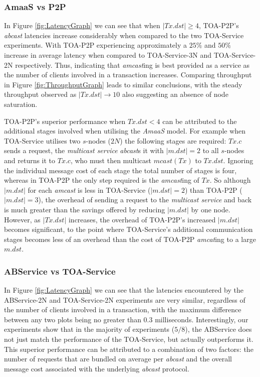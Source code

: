     \subsubsection*{AmaaS vs P2P}
	In Figure \ref{fig:LatencyGraph} we can see that when $|Tx.dst| \geq 4$, TOA-P2P's \emph{abcast} latencies increase considerably when compared to the two TOA-Service experiments.  With TOA-P2P experiencing approximately a $25\%$ and $50\%$ increase in average latency when compared to TOA-Service-3N and TOA-Service-2N respectively.  Thus, indicating that \emph{amcast}ing is best provided as a service as the number of clients involved in a transaction increases. Comparing throughput in Figure \ref{fig:ThroughputGraph} leads to similar conclusions, with the steady throughput observed as $|Tx.dst| \rightarrow 10$ also suggesting an absence of node saturation.  
	
	TOA-P2P's superior performance when $Tx.dst < 4$ can be attributed to the additional stages involved when utilising the \emph{AmaaS} model.  For example when TOA-Service utilises two $s$-nodes ($2N$) the following stages are required: $Tx.c$ sends a request, the \emph{multicast service} \emph{abcast}s it with $|m.dst| = 2$ to all $s$-nodes and returns it to $Tx.c$, who must then multicast $mcast(Tx)$ to $Tx.dst$.  Ignoring the individual message cost of each stage the total number of stages is four, whereas in TOA-P2P the only step required is the \emph{amcast}ing of $Tx$.  So although $|m.dst|$ for each \emph{amcast} is less in TOA-Service ($|m.dst| = 2$) than TOA-P2P ($|m.dst| = 3$), the overhead of sending a request to the \emph{multicast service} and back is much greater than the savings offered by reducing $|m.dst|$ by one node.  However, as $|Tx.dst|$ increases, the overhead of TOA-P2P's increased $|m.dst|$ becomes significant, to the point where TOA-Service's additional communication stages becomes less of an overhead than the cost of TOA-P2P \emph{amcat}ing to a large $m.dst$.  
	
    \subsubsection*{ABService vs TOA-Service}
    In Figure \ref{fig:LatencyGraph} we can see that the latencies encountered by the ABService-2N and TOA-Service-2N experiments are very similar, regardless of the number of clients involved in a transaction, with the maximum difference between any two plots being no greater than $0.3$ milliseconds.  Interestingly, our experiments show that in the majority of experiments ($5/8$), the ABService does not just match the performance of the TOA-Service, but actually outperforms it.  This superior performance can be attributed to a combination of two factors: the number of requests that are bundled on average per \emph{abcast} and the overall message cost associated with the underlying \emph{abcast} protocol.  
    
